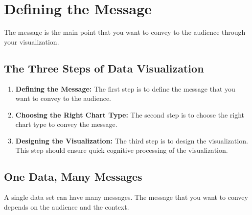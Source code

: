 \documentclass[11pt,fleqn]{book} %
\begin{document}
\section{Defining the Message}

\begin{definition}[Message]
  The message is the main point that you want to convey to the audience
  through your visualization.
\end{definition}

\subsection{The Three Steps of Data Visualization}

\begin{enumerate}
  \item \textbf{Defining the Message:}
    The first step is to define the message that you want to convey to the audience.
  \item \textbf{Choosing the Right Chart Type:}
    The second step is to choose the right chart type to convey the message.
  \item \textbf{Designing the Visualization:}
    The third step is to design the visualization.
    This step should ensure quick cognitive processing of the visualization.
\end{enumerate}

\subsection{One Data, Many Messages}

A single data set can have many messages.
The message that you want to convey
depends on the audience and the context.\\
\end{document}
